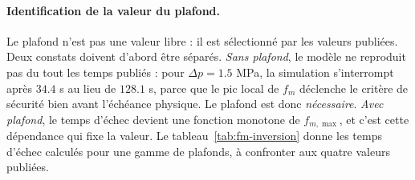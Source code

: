 \documentclass[11pt,a4paper]{report}
\begin{document}
\paragraph{Identification de la valeur du plafond.} Le plafond n'est pas une valeur libre : il est
sélectionné par les valeurs publiées. Deux constats doivent d'abord être séparés. \emph{Sans plafond}, le
modèle ne reproduit pas du tout les temps publiés : pour \(\Delta p = 1.5\) MPa, la simulation s'interrompt
après \(34.4\) s au lieu de \(128.1\) s, parce que le pic local de \(f_m\) déclenche le critère de sécurité
bien avant l'échéance physique. Le plafond est donc \emph{nécessaire}. \emph{Avec plafond}, le temps
d'échec devient une fonction monotone de \(f_{m,\max}\), et c'est cette dépendance qui fixe la valeur. Le
tableau~\ref{tab:fm-inversion} donne les temps d'échec calculés pour une gamme de plafonds, à confronter
aux quatre valeurs publiées.
\end{document}
